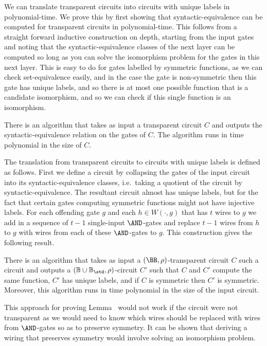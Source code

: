 \documentclass[a4paper,UKenglish]{lipics-v2018}
\begin{document}
We can translate transparent circuits into circuits with unique labels in
polynomial-time. We prove this by first showing that syntactic-equivalence can
be computed for transparent circuits in polynomial-time. This follows from a
straight forward inductive construction on depth, starting from the input gates
and noting that the syntactic-equivalence classes of the next layer can be
computed so long as you can solve the isomorphism problem for the gates in this
next layer. This is easy to do for gates labelled by symmetric functions, as we
can check set-equivalence easily, and in the case the gate is non-symmetric then
this gate has unique labels, and so there is at most one possible function that
is a candidate isomorphism, and so we can check if this single function is an
isomorphism.

\begin{lemma}
  There is an algorithm that takes as input a transparent circuit $C$ and
  outputs the syntactic-equivalence relation on the gates of $C$. The algorithm
  runs in time polynomial in the size of $C$.
  \label{lem:transparent-syntactic-equiv}
\end{lemma}

The translation from transparent circuits to circuits with unique labels is
defined as follows. First we define a circuit by collapsing the gates of the
input circuit into its syntactic-equivalence classes, i.e.\ taking a quotient of
the circuit by syntactic-equivalence. The resultant circuit almost has unique
labels, but for the fact that certain gates computing symmetric functions might
not have injective labels. For each offending gate $g$ and each $h \in W(\cdot,
g)$ that has $t$ wires to $g$ we add in a sequence of $t-1$ single-input
$\AND$-gates and replace $t-1$ wires from $h$ to $g$ with wires from each of
these $\AND$-gates to $g$. This construction gives the following result.

\begin{lemma}
  There is an algorithm that takes as input a $(\BB, \rho)$-transparent circuit
  $C$ such a circuit and outputs a $(\mathbb{B} \cup \mathbb{B}_{\std},
  \rho)$-circuit $C'$ such that $C$ and $C'$ compute the same function, $C'$ has
  unique labels, and if $C$ is symmetric then $C'$ is symmetric. Moreover, this
  algorithm runs in time polynomial in the size of the input circuit.
  \label{lem:transparent-unique}
\end{lemma}

This approach for proving Lemma~\cite{lem:trannsparent-unique} would not work if
the circuit were not transparent as we would need to know which wires should be
replaced with wires from $\AND$-gates so as to preserve symmetry. It can be
shown that deriving a wiring that preserves symmetry would involve solving an
isomorphism problem.
\end{document}
